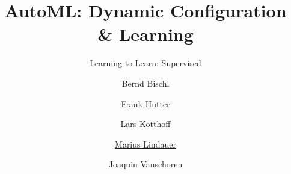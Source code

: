 


\title[AutoML: L2L Supervised]{AutoML: Dynamic Configuration \& Learning}
\subtitle{Learning to Learn: Supervised}
\author[Marius Lindauer]{Bernd Bischl \and Frank Hutter \and Lars Kotthoff\newline \and \underline{Marius Lindauer} \and Joaquin Vanschoren}
\institute{}
\date{}





	
	\maketitle
	

